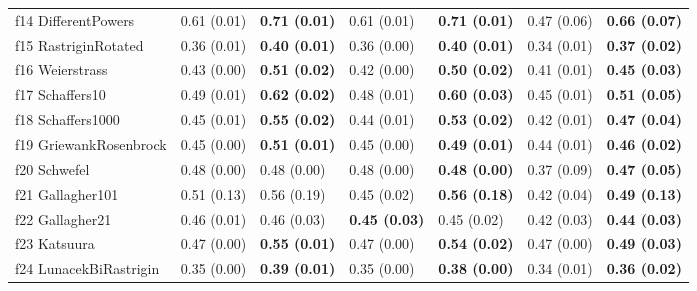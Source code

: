 \begin{table}
\begin{tabular}{lllllll}
f14 DifferentPowers & 0.61 (0.01) & \textbf{0.71 (0.01)} & 0.61 (0.01) & \textbf{0.71 (0.01)} & 0.47 (0.06) & \textbf{0.66 (0.07)} \\
f15 RastriginRotated & 0.36 (0.01) & \textbf{0.40 (0.01)} & 0.36 (0.00) & \textbf{0.40 (0.01)} & 0.34 (0.01) & \textbf{0.37 (0.02)} \\
f16 Weierstrass & 0.43 (0.00) & \textbf{0.51 (0.02)} & 0.42 (0.00) & \textbf{0.50 (0.02)} & 0.41 (0.01) & \textbf{0.45 (0.03)} \\
f17 Schaffers10 & 0.49 (0.01) & \textbf{0.62 (0.02)} & 0.48 (0.01) & \textbf{0.60 (0.03)} & 0.45 (0.01) & \textbf{0.51 (0.05)} \\
f18 Schaffers1000 & 0.45 (0.01) & \textbf{0.55 (0.02)} & 0.44 (0.01) & \textbf{0.53 (0.02)} & 0.42 (0.01) & \textbf{0.47 (0.04)} \\
f19 GriewankRosenbrock & 0.45 (0.00) & \textbf{0.51 (0.01)} & 0.45 (0.00) & \textbf{0.49 (0.01)} & 0.44 (0.01) & \textbf{0.46 (0.02)} \\
f20 Schwefel & 0.48 (0.00) & 0.48 (0.00) & 0.48 (0.00) & \textbf{0.48 (0.00)} & 0.37 (0.09) & \textbf{0.47 (0.05)} \\
f21 Gallagher101 & 0.51 (0.13) & 0.56 (0.19) & 0.45 (0.02) & \textbf{0.56 (0.18)} & 0.42 (0.04) & \textbf{0.49 (0.13)} \\
f22 Gallagher21 & 0.46 (0.01) & 0.46 (0.03) & \textbf{0.45 (0.03)} & 0.45 (0.02) & 0.42 (0.03) & \textbf{0.44 (0.03)} \\
f23 Katsuura & 0.47 (0.00) & \textbf{0.55 (0.01)} & 0.47 (0.00) & \textbf{0.54 (0.02)} & 0.47 (0.00) & \textbf{0.49 (0.03)} \\
f24 LunacekBiRastrigin & 0.35 (0.00) & \textbf{0.39 (0.01)} & 0.35 (0.00) & \textbf{0.38 (0.00)} & 0.34 (0.01) & \textbf{0.36 (0.02)} \\
\bottomrule
\end{tabular}
\end{table}
